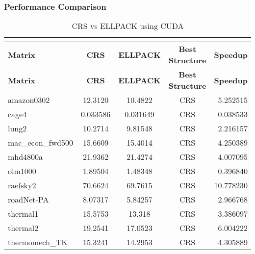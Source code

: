 \documentclass[12pt,oneside]{book} %
\begin{document}
\subsubsection{Performance Comparison}





\newpage
\begin{longtable}{lcccr}
    \caption{CRS vs ELLPACK using CUDA}                                                              \\
    \label{tab:crsvsellpackcuda}                                                                     \\
    \toprule
    \textbf{Matrix}   & \textbf{CRS} & \textbf{ELLPACK} & \textbf{Best Structure} & \textbf{Speedup} \\
    \midrule
    \endfirsthead
    \toprule
    \textbf{Matrix}   & \textbf{CRS} & \textbf{ELLPACK} & \textbf{Best Structure} & \textbf{Speedup} \\
    \midrule
    \endhead
    \bottomrule
    \endfoot
    amazon0302        & 12.3120      & 10.4822          & CRS                     & 5.252515         \\
    cage4             & 0.033586     & 0.031649         & CRS                     & 0.038533         \\
    lung2             & 10.2714      & 9.81548          & CRS                     & 2.216157         \\
    mac\_econ\_fwd500 & 15.6609      & 15.4014          & CRS                     & 4.250389         \\
    mhd4800a          & 21.9362      & 21.4274          & CRS                     & 4.007095         \\
    olm1000           & 1.89504      & 1.48348          & CRS                     & 0.396840         \\
    raefsky2          & 70.6624      & 69.7615          & CRS                     & 10.778230        \\
    roadNet-PA        & 8.07317      & 5.84257          & CRS                     & 2.966768         \\
    thermal1          & 15.5753      & 13.318           & CRS                     & 3.386097         \\
    thermal2          & 19.2541      & 17.0523          & CRS                     & 6.004222         \\
    thermomech\_TK    & 15.3241      & 14.2953          & CRS                     & 4.305889         \\

\end{longtable}
\end{document}

